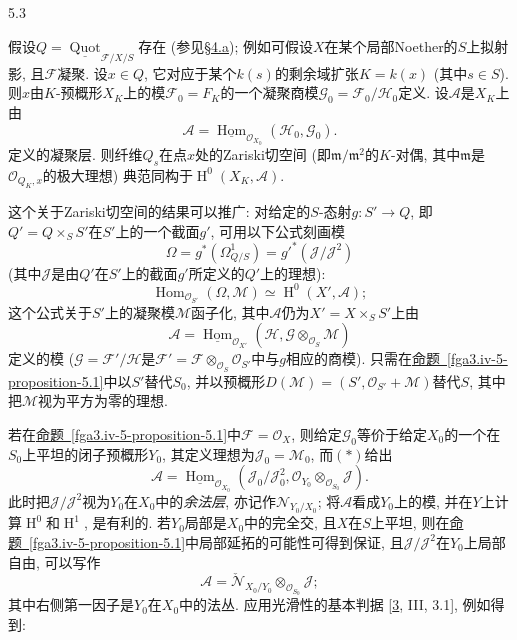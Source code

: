 \begin{corollary}{5.3}\label{fga3.iv-5-corollary-5.3}\skipsinglepar
\par{}假设\(Q=\underline {\operatorname {Quot}}_{\mathscr {F}/X/S}\)存在 (参见\hyperref[fga3.iv-4.a]{§4.a}); 例如可假设\(X\)在某个局部Noether的\(S\)上拟射影, 且\(\mathscr {F}\)凝聚. 设\(x\in  Q\), 它对应于某个\(k(s)\)的剩余域扩张\(K=k(x)\) (其中\(s\in  S\)). 则\(x\)由\(K\)-预概形\(X_K\)上的模\(\mathscr {F}_0=F_K\)的一个凝聚商模\(\mathscr {G}_0=\mathscr {F}_0/\mathscr {H}_0\)定义. 设\(\mathscr {A}\)是\(X_K\)上由\[       \mathscr {A} = \underline {\operatorname {Hom}}_{\mathcal {O}_{X_0}}(\mathscr {H}_0,\mathscr {G}_0).     \]定义的凝聚层. 则纤维\(Q_s\)在点\(x\)处的Zariski切空间 (即\(\mathfrak {m}/\mathfrak {m}^2\)的\(K\)-对偶, 其中\(\mathfrak {m}\)是\(\mathcal {O}_{Q_K,x}\)的极大理想) 典范同构于\(\operatorname {H}^0(X_K,\mathscr {A})\).
\end{corollary}
\par{}这个关于Zariski切空间的结果可以推广: 对给定的\(S\)-态射\(g\colon  S'\to  Q\), 即\(Q'=Q\times _S S'\)在\(S'\)上的一个截面\(g'\), 可用以下公式刻画模\[     \Omega      = g^*(\Omega _{Q/S}^1)     = {g'}^*(\mathscr {J}/\mathscr {J}^2)   \] (其中\(\mathscr {J}\)是由\(Q'\)在\(S'\)上的截面\(g'\)所定义的\(Q'\)上的理想): \[     \operatorname {Hom}_{\mathcal {O}_{S'}}(\Omega ,\mathscr {M})     \simeq  \operatorname {H}^0(X',\mathscr {A});\] 这个公式关于\(S'\)上的凝聚模\(\mathscr {M}\)函子化, 其中\(\mathscr {A}\)仍为\(X'=X\times _S S'\)上由\[     \mathscr {A} = \underline {\operatorname {Hom}}_{\mathcal {O}_{X'}}(\mathscr {H},\mathscr {G}\otimes _{\mathcal {O}_S}\mathscr {M})   \]定义的模 (\(\mathscr {G}=\mathscr {F}'/\mathscr {H}\)是\(\mathscr {F}'=\mathscr {F}\otimes _{\mathcal {O}_S}\mathcal {O}_{S'}\)中与\(g\)相应的商模). 只需在\hyperref[fga3.iv-5-proposition-5.1]{命题~\ref*{fga3.iv-5-proposition-5.1}}中以\(S'\)替代\(S_0\), 并以预概形\(D(\mathscr {M})=(S',\mathcal {O}_{S'}+\mathscr {M})\)替代\(S\), 其中把\(\mathscr {M}\)视为平方为零的理想.
\par{}若在\hyperref[fga3.iv-5-proposition-5.1]{命题~\ref*{fga3.iv-5-proposition-5.1}}中\(\mathscr {F}=\mathcal {O}_X\), 则给定\(\mathscr {G}_0\)等价于给定\(X_0\)的一个在\(S_0\)上平坦的闭子预概形\(Y_0\), 其定义理想为\(\mathscr {J}_0=\mathscr {M}_0\), 而\((*)\)给出\[     \mathscr {A}     = \underline {\operatorname {Hom}}_{\mathcal {O}_{X_0}}(\mathscr {J}_0/\mathscr {J}_0^2,\mathcal {O}_{Y_0}\otimes _{\mathcal {O}_{S_0}}\mathscr {J}).\] 此时把\(\mathscr {J}/\mathscr {J}^2\)视为\(Y_0\)在\(X_0\)中的\emph{余法层}, 亦记作\(\mathscr {N}_{Y_0/X_0}\); 将\(\mathscr {A}\)看成\(Y_0\)上的模, 并在\(Y\)上计算\(\operatorname {H}^0\)和\(\operatorname {H}^1\), 是有利的. 若\(Y_0\)局部是\(X_0\)中的完全交, 且\(X\)在\(S\)上平坦, 则在\hyperref[fga3.iv-5-proposition-5.1]{命题~\ref*{fga3.iv-5-proposition-5.1}}中局部延拓的可能性可得到保证, 且\(\mathscr {J}/\mathscr {J}^2\)在\(Y_0\)上局部自由, 可以写作\[     \mathscr {A}     = \check {\mathscr {N}}_{X_0/Y_0}\otimes _{\mathcal {O}_{S_0}}\mathscr {J};\] 其中右侧第一因子是\(Y_0\)在\(X_0\)中的法丛. 应用光滑性的基本判据 [\hyperref[Gro1960b]{3}, III, 3.1], 例如得到:
